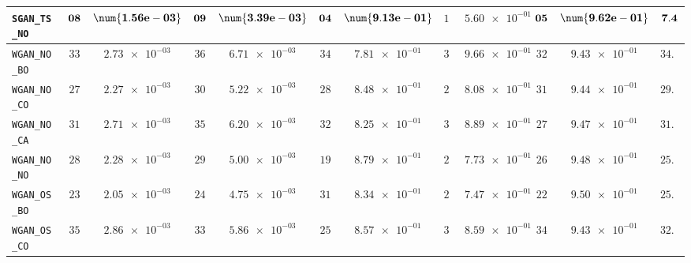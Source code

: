 \begin{table}[H]
\begin{tabularx}{\textwidth}{l||cC|cC|cC|cC|cC||c}
		\texttt{SGAN\_TS\_NO} & $\bf 08$ & $\bf \num{1.56e-03}$ & $\bf 09$ & $\bf \num{3.39e-03}$ & $\bf 04$ & $\bf \num{9.13e-01}$ & $ 11$ & $ \num{5.60e-01}$ & $\bf 05$ & $\bf \num{9.62e-01}$ & $\bf 7.4$  \\ \hline
		\texttt{WGAN\_NO\_BO} & $ 33$ & $ \num{2.73e-03}$ & $ 36$ & $ \num{6.71e-03}$ & $ 34$ & $ \num{7.81e-01}$ & $ 36$ & $ \num{9.66e-01}$ & $ 32$ & $ \num{9.43e-01}$ & $ 34.2$  \\
		\texttt{WGAN\_NO\_CO} & $ 27$ & $ \num{2.27e-03}$ & $ 30$ & $ \num{5.22e-03}$ & $ 28$ & $ \num{8.48e-01}$ & $ 29$ & $ \num{8.08e-01}$ & $ 31$ & $ \num{9.44e-01}$ & $ 29.0$  \\
		\texttt{WGAN\_NO\_CA} & $ 31$ & $ \num{2.71e-03}$ & $ 35$ & $ \num{6.20e-03}$ & $ 32$ & $ \num{8.25e-01}$ & $ 34$ & $ \num{8.89e-01}$ & $ 27$ & $ \num{9.47e-01}$ & $ 31.8$  \\
		\texttt{WGAN\_NO\_NO} & $ 28$ & $ \num{2.28e-03}$ & $ 29$ & $ \num{5.00e-03}$ & $ 19$ & $ \num{8.79e-01}$ & $ 27$ & $ \num{7.73e-01}$ & $ 26$ & $ \num{9.48e-01}$ & $ 25.8$  \\
		\texttt{WGAN\_OS\_BO} & $ 23$ & $ \num{2.05e-03}$ & $ 24$ & $ \num{4.75e-03}$ & $ 31$ & $ \num{8.34e-01}$ & $ 26$ & $ \num{7.47e-01}$ & $ 22$ & $ \num{9.50e-01}$ & $ 25.2$  \\
		\texttt{WGAN\_OS\_CO} & $ 35$ & $ \num{2.86e-03}$ & $ 33$ & $ \num{5.86e-03}$ & $ 25$ & $ \num{8.57e-01}$ & $ 33$ & $ \num{8.59e-01}$ & $ 34$ & $ \num{9.43e-01}$ & $ 32.0$  \\

\end{tabularx}
\end{table}
